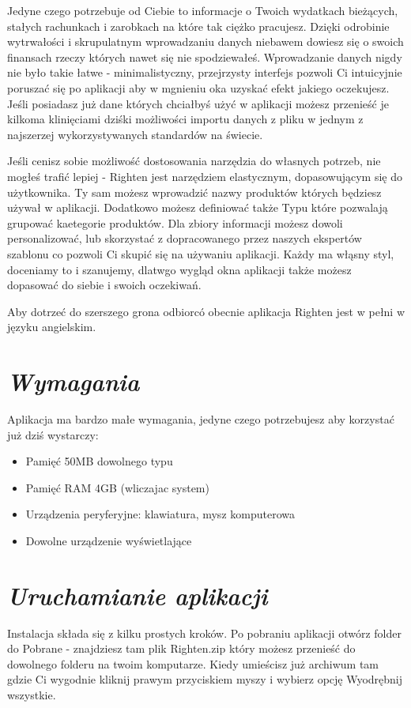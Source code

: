\documentclass[a4paper,10pt, twoside]{report}
\newcommand{\customstylesection}[1]{\textbf{\textit{#1}}}
\begin{document}
{Jedyne czego potrzebuje od Ciebie to informacje o Twoich wydatkach bieżących, 
stałych rachunkach i zarobkach na które tak ciężko pracujesz. Dzięki odrobinie 
wytrwałości i skrupulatnym wprowadzaniu danych niebawem dowiesz się o swoich 
finansach rzeczy których nawet się nie spodziewałeś. Wprowadzanie danych nigdy 
nie było takie łatwe - minimalistyczny, przejrzysty interfejs pozwoli Ci 
intuicyjnie poruszać się po aplikacji aby w mgnieniu oka uzyskać efekt jakiego 
oczekujesz. Jeśli posiadasz już dane których chciałbyś użyć w aplikacji możesz
przenieść je kilkoma klinięciami dziśki możliwości importu danych z pliku w 
jednym z najszerzej wykorzystywanych standardów na świecie.}

{Jeśli cenisz sobie możliwość dostosowania narzędzia do własnych potrzeb, nie 
mogłeś trafić lepiej - Righten jest narzędziem elastycznym, dopasowującym się 
do użytkownika. Ty sam możesz wprowadzić nazwy produktów których będziesz używał
w aplikacji. Dodatkowo możesz definiować także Typu które pozwalają grupować 
kaetegorie produktów. Dla zbiory informacji możesz dowoli personalizować, lub 
skorzystać z dopracowanego przez naszych ekspertów szablonu co pozwoli Ci skupić
 się na używaniu aplikacji. Każdy ma włąsny styl, doceniamy to i szanujemy, 
 dlatwgo wygląd okna aplikacji także możesz dopasować do siebie i swoich 
 oczekiwań.}

 {Aby dotrzeć do szerszego grona odbiorcó obecnie aplikacja Righten jest w 
 pełni w języku angielskim.}

\section{\customstylesection{Wymagania}}
{Aplikacja ma bardzo małe wymagania, jedyne czego potrzebujesz aby korzystać 
już dziś wystarczy:}

\begin{minipage}{\textwidth}
    \begin{itemize}
        \item Pamięć 50MB dowolnego typu
        \item Pamięć RAM 4GB (wliczajac system)
        \item Urządzenia peryferyjne: klawiatura, mysz komputerowa
        \item Dowolne urządzenie wyświetlające
    \end{itemize}
\end{minipage}

\section{\customstylesection{Uruchamianie aplikacji}}
{Instalacja składa się z kilku prostych kroków. Po pobraniu aplikacji otwórz 
folder do Pobrane - znajdziesz tam plik Righten.zip który możesz przenieść do 
dowolnego folderu na twoim komputarze. Kiedy umieścisz już archiwum tam gdzie Ci
 wygodnie kliknij prawym przyciskiem myszy i wybierz opcję Wyodrębnij wszystkie.}
\end{document}
